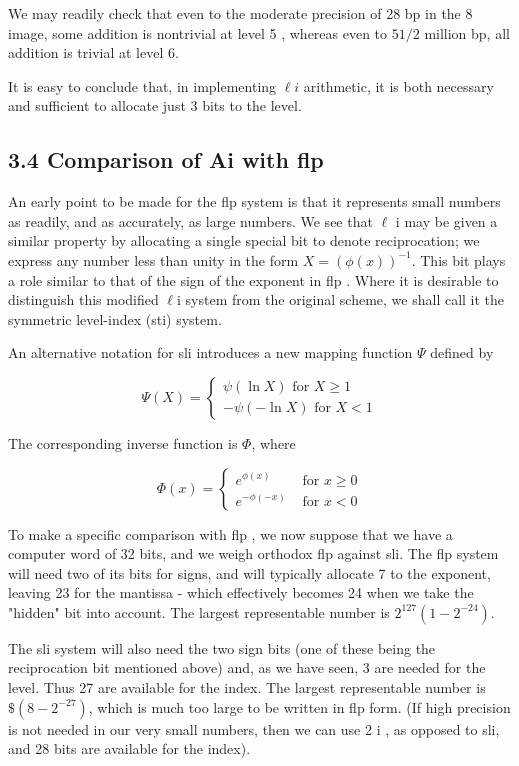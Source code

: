 \documentclass[10pt]{article}
\begin{document}
We may readily check that even to the moderate precision of 28 bp in the 8 image, some addition is nontrivial at level 5 , whereas even to $51 / 2$ million bp, all addition is trivial at level 6.

It is easy to conclude that, in implementing $\ell i$ arithmetic, it is both necessary and sufficient to allocate just 3 bits to the level.

\subsection*{3.4 Comparison of Ai with flp}
An early point to be made for the flp system is that it represents small numbers as readily, and as accurately, as large numbers. We see that $\ell$ i may be given a similar property by allocating a single special bit to denote reciprocation; we express any number less than unity in the form $X=(\phi(x))^{-1}$. This bit plays a role similar to that of the sign of the exponent in flp . Where it is desirable to distinguish this modified $\ell \mathrm{i}$ system from the original scheme, we shall call it the symmetric level-index (sti) system.

An alternative notation for sli introduces a new mapping function $\Psi$ defined by

$$
\Psi(X)=\left\{\begin{array}{l}
\psi(\ln X) \text { for } X \geqslant 1 \\
-\psi(-\ln X) \text { for } X<1
\end{array}\right.
$$

The corresponding inverse function is $\Phi$, where

$$
\Phi(x)= \begin{cases}e^{\phi(x)} & \text { for } x \geqslant 0 \\ e^{-\phi(-x)} & \text { for } x<0\end{cases}
$$

To make a specific comparison with flp , we now suppose that we have a computer word of 32 bits, and we weigh orthodox flp against sli. The flp system will need two of its bits for signs, and will typically allocate 7 to the exponent, leaving 23 for the mantissa - which effectively becomes 24 when we take the "hidden" bit into account. The largest representable number is $2^{127}\left(1-2^{-24}\right)$.

The sli system will also need the two sign bits (one of these being the reciprocation bit mentioned above) and, as we have seen, 3 are needed for the level. Thus 27 are available for the index. The largest representable number is $\$\left(8-2^{-27}\right)$, which is much too large to be written in flp form. (If high precision is not needed in our very small numbers, then we can use 2 i , as opposed to sli, and 28 bits are available for the index).
\end{document}

